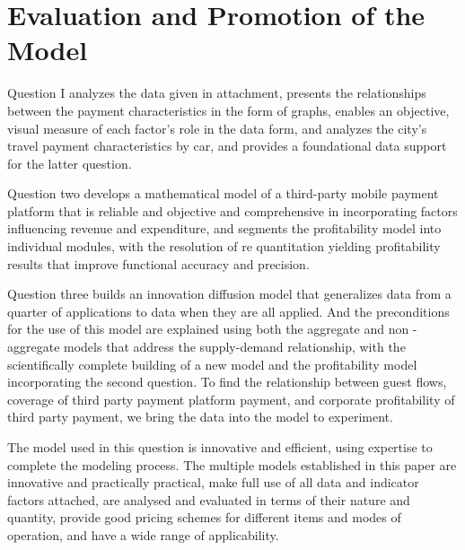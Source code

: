 \documentclass[../mcmpaper]{subfiles}
\begin{document}
	\section{Evaluation and Promotion of the Model}
	Question I analyzes the data given in attachment, presents the relationships between the payment characteristics in the form of graphs, enables an objective, visual measure of each factor's role in the data form, and analyzes the city's travel payment characteristics by car, and provides a foundational data support for the latter question.
\par
Question two develops a mathematical model of a third-party mobile payment platform that is reliable and objective and comprehensive in incorporating factors influencing revenue and expenditure, and segments the profitability model into individual modules, with the resolution of re quantitation yielding profitability results that improve functional accuracy and precision.
\par
Question three builds an innovation diffusion model that generalizes data from a quarter of applications to data when they are all applied. And the preconditions for the use of this model are explained using both the aggregate and non - aggregate models that address the supply-demand relationship, with the scientifically complete building of a new model and the profitability model incorporating the second question. To find the relationship between guest flows, coverage of third party payment platform payment, and corporate profitability of third party payment, we bring the data into the model to experiment.
\par
The model used in this question is innovative and efficient, using expertise to complete the modeling process. The multiple models established in this paper are innovative and practically practical, make full use of all data and indicator factors attached, are analysed and evaluated in terms of their nature and quantity, provide good pricing schemes for different items and modes of operation, and have a wide range of applicability.
\end{document}
